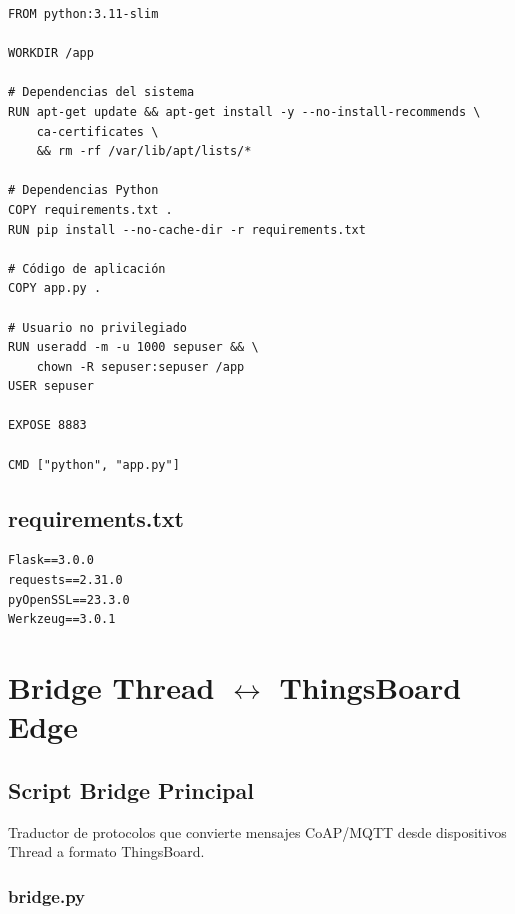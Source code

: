 \begin{verbatim}
FROM python:3.11-slim

WORKDIR /app

# Dependencias del sistema
RUN apt-get update && apt-get install -y --no-install-recommends \
    ca-certificates \
    && rm -rf /var/lib/apt/lists/*

# Dependencias Python
COPY requirements.txt .
RUN pip install --no-cache-dir -r requirements.txt

# Código de aplicación
COPY app.py .

# Usuario no privilegiado
RUN useradd -m -u 1000 sepuser && \
    chown -R sepuser:sepuser /app
USER sepuser

EXPOSE 8883

CMD ["python", "app.py"]
\end{verbatim}

\subsection{requirements.txt}

\begin{verbatim}
Flask==3.0.0
requests==2.31.0
pyOpenSSL==23.3.0
Werkzeug==3.0.1
\end{verbatim}

\section{Bridge Thread $\leftrightarrow$ ThingsBoard Edge}

\subsection{Script Bridge Principal}

Traductor de protocolos que convierte mensajes CoAP/MQTT desde dispositivos Thread a formato ThingsBoard.

\subsubsection{bridge.py}

